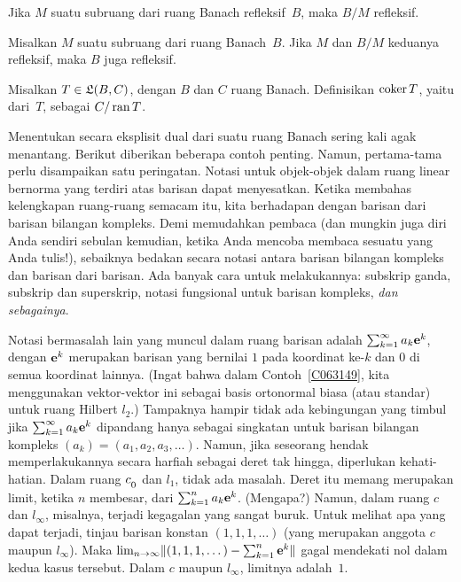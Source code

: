 \begin{cor} Jika $M$ suatu subruang dari ruang Banach refleksif~$B$, maka $B/M$ refleksif.
\end{cor}

\begin{cor} Misalkan $M$ suatu subruang dari ruang Banach~$B$. Jika $M$ dan $B/M$ keduanya refleksif,
maka $B$ juga refleksif.
\end{cor}



















\begin{defn} Misalkan $T \in \mathfrak{L}(B,C)$, dengan $B$ dan $C$ ruang Banach. Definisikan
$\operatorname{coker} T$, yaitu
 dari~$T$, sebagai $C/\operatorname{ran} T$.
\end{defn}



Menentukan secara eksplisit dual dari suatu ruang Banach sering kali agak menantang. Berikut diberikan beberapa
contoh penting. Namun, pertama-tama perlu disampaikan satu peringatan. Notasi untuk objek-objek dalam ruang linear bernorma
yang terdiri atas barisan dapat menyesatkan. Ketika membahas kelengkapan ruang-ruang semacam itu, kita berhadapan dengan barisan dari
barisan bilangan kompleks. Demi memudahkan pembaca (dan mungkin juga diri Anda sendiri sebulan kemudian,
ketika Anda mencoba membaca sesuatu yang Anda tulis!), sebaiknya bedakan secara notasi antara barisan bilangan kompleks
dan barisan dari barisan. Ada banyak cara untuk melakukannya: subskrip ganda, subskrip dan
superskrip, notasi fungsional untuk barisan kompleks, \emph{dan sebagainya}.

Notasi bermasalah lain yang muncul dalam ruang barisan adalah $\sum_{k=1}^\infty a_k \mathbf{e}^k$, dengan $\mathbf{e}^k$
merupakan barisan yang bernilai $1$ pada koordinat ke-$k$ dan $0$ di semua koordinat lainnya. (Ingat bahwa dalam
Contoh~\ref{C063149}, kita menggunakan vektor-vektor ini sebagai basis ortonormal biasa (atau standar) untuk ruang Hilbert
$l_2$.) Tampaknya hampir tidak ada kebingungan yang timbul jika $\sum_{k=1}^\infty a_k \mathbf{e}^k$ dipandang
hanya sebagai singkatan untuk barisan bilangan kompleks $(a_k) = (a_1,a_2,a_3,\dots)$. Namun, jika seseorang hendak
memperlakukannya secara harfiah sebagai deret tak hingga, diperlukan kehati-hatian. Dalam ruang $c_{{}_{\scriptstyle{0}}}$ dan $l_1$, tidak ada
masalah. Deret itu memang merupakan limit, ketika $n$ membesar, dari $\sum_{k=1}^n a_k \mathbf{e}^k$. (Mengapa?) Namun, dalam ruang
$c$ dan $l_\infty$, misalnya, terjadi kegagalan yang sangat buruk. Untuk melihat apa yang dapat terjadi, tinjau barisan konstan
$(1,1,1,\dots)$ (yang merupakan anggota $c$ maupun $l_\infty$). Maka
$\lim_{n \rightarrow\infty}\lVert(1,1,1,\dots) - \sum_{k=1}^n \mathbf{e}^k\rVert$ gagal mendekati nol dalam kedua kasus tersebut.
Dalam $c$ maupun $l_\infty$, limitnya adalah~$1$.

